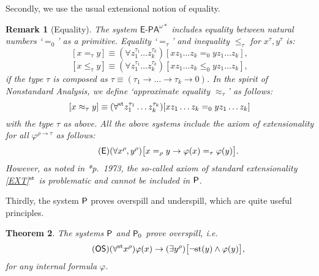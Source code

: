\documentclass[reqno]{amsart}
\newtheorem{thm}{Theorem}
\newtheorem{rem}[thm]{Remark}
\newcommand\be{\begin{equation}}
\newcommand\ee{\end{equation}}
\def\P{\textup{\textsf{P}}}
\def\st{\textup{st}}
\def\di{\rightarrow}
\def\QFAC{\textup{\textsf{QF-AC}}}
\numberwithin{equation}{section}
\numberwithin{thm}{section}
\begin{document}
Secondly, we use the usual extensional notion of equality. 
\begin{rem}[Equality]\label{equ}\rm
The system $\textsf{E-PA}^{\omega*}$ includes equality between natural numbers `$=_{0}$' as a primitive.  Equality `$=_{\tau}$' and inequality $\leq_{\tau}$ for $x^{\tau},y^{\tau}$ is:
\be\label{aparth}
[x=_{\tau}y] \equiv (\forall z_{1}^{\tau_{1}}\dots z_{k}^{\tau_{k}})[xz_{1}\dots z_{k}=_{0}yz_{1}\dots z_{k}],
\ee
\be\label{aparth1}
[x\leq_{\tau}y] \equiv (\forall z_{1}^{\tau_{1}}\dots z_{k}^{\tau_{k}})[xz_{1}\dots z_{k}\leq_{0}yz_{1}\dots z_{k}],
\ee
if the type $\tau$ is composed as $\tau\equiv(\tau_{1}\di \dots\di \tau_{k}\di 0)$.
In the spirit of Nonstandard Analysis, we define `approximate equality $\approx_{\tau}$' as follows:
\be\label{aparth2}
[x\approx_{\tau}y] \equiv (\forall^{\st} z_{1}^{\tau_{1}}\dots z_{k}^{\tau_{k}})[xz_{1}\dots z_{k}=_{0}yz_{1}\dots z_{k}]
\ee
with the type $\tau$ as above.  
All the above systems include the \emph{axiom of extensionality} for all $\varphi^{\rho\di \tau}$ as follows:
\be\label{EXT}\tag{\textsf{E}}  
(\forall  x^{\rho},y^{\rho}) \big[x=_{\rho} y \di \varphi(x)=_{\tau}\varphi(y)   \big].
\ee
However, as noted in \cite{brie}*{p.\ 1973}, the so-called axiom of \emph{standard} extensionality \eqref{EXT}$^{\st}$ is problematic and cannot be included in $\P$.  
\end{rem}
Thirdly, the system $\P$ proves overspill and underspill, which are quite useful principles.
\begin{thm}\label{doppi}
The systems $\P$ and $\P_{0}$ prove \emph{overspill}, i.e.\
\be\tag{\textsf{OS}}
(\forall^{\st}x^{\rho})\varphi(x)\di (\exists y^{\rho})\big[\neg\st(y)\wedge \varphi(y)  \big],
\ee
for any internal formula $\varphi$.
\end{thm}
\end{document}
